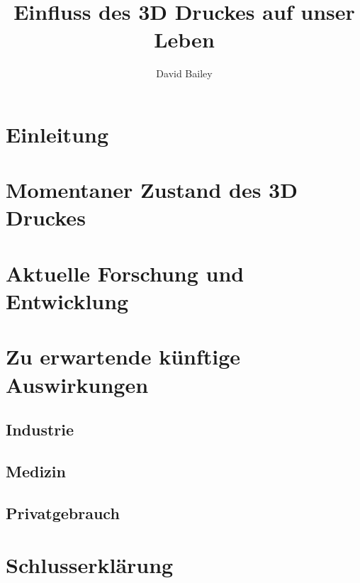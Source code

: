 \documentclass[11pt,a4paper]{article}
\author{David Bailey}
\title{Einfluss des 3D Druckes auf unser Leben}
\begin{document}
\onehalfspacing



\pagestyle{empty}
\tableofcontents

\newpage
\pagestyle{headings}
\section{Einleitung}

\newpage
\section{Momentaner Zustand des 3D Druckes}


\newpage
\section{Aktuelle Forschung und Entwicklung}


\newpage
\section{Zu erwartende künftige Auswirkungen}
\subsection{Industrie}
\subsection{Medizin}
\subsection{Privatgebrauch}


\newpage

\printbibliography[heading=bibintoc]

\section*{Schlusserklärung}
\end{document}
